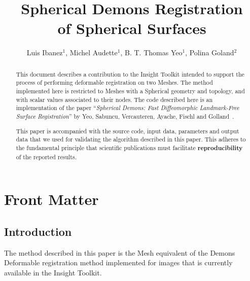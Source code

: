 \documentclass{InsightArticle}
\title{Spherical Demons Registration\\ of Spherical Surfaces}
\author{Luis Ibanez$^{1}$, Michel Audette$^{1}$, B. T. Thomas Yeo$^{1}$, Polina Goland$^{2}$}
\newcommand{\IJhandlerIDnumber}{3117}
\begin{document}
%
% 
\IJhandlefooter{\IJhandlerIDnumber}


\ifpdf
\else
\fi


\maketitle


\ifhtml
\chapter*{Front Matter\label{front}}
\fi


\begin{abstract}
\noindent
This document describes a contribution to the Insight Toolkit intended to
support the process of performing deformable registration on two Meshes. The
method implemented here is restricted to Meshes with a Spherical geometry and
topology, and with scalar values associated to their nodes. The code described
here is an implementation of the paper ``\emph{Spherical Demons: Fast
Diffeomorphic Landmark-Free Surface Registration}'' by Yeo, Sabuncu,
Vercauteren, Ayache, Fischl and Golland~\cite{Yeo2008,Yeo2009}.

This paper is accompanied with the source code, input data, parameters and
output data that we used for validating the algorithm described in this paper.
This adheres to the fundamental principle that scientific publications must
facilitate \textbf{reproducibility} of the reported results.
\end{abstract}

\tableofcontents

\section{Introduction}

The method described in this paper is the Mesh equivalent of the Demons
Deformable registration method implemented for images that is currently
available in the Insight Toolkit.
\end{document}
